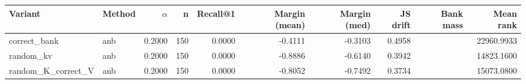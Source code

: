 \begin{tabular}{l l r r r r r r r r}
\toprule
Variant & Method & $\alpha$ & n & Recall@1 & Margin (mean) & Margin (med) & JS drift & Bank mass & Mean rank \\
\midrule
correct\_bank & anb & 0.2000 & 150 & 0.0000 & -0.4111 & -0.3103 & 0.4958 &  & 22960.9933 \\
random\_kv & anb & 0.2000 & 150 & 0.0000 & -0.8886 & -0.6140 & 0.3942 &  & 14823.1600 \\
random\_K\_correct\_V & anb & 0.2000 & 150 & 0.0000 & -0.8052 & -0.7492 & 0.3734 &  & 15073.0800 \\
\bottomrule
\end{tabular}
